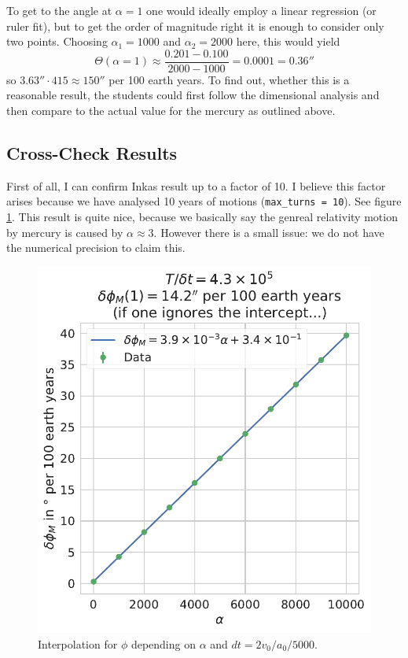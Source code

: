 \documentclass[12pt]{iopart}
\begin{document}
To get to the angle at $\alpha=1$ one would ideally employ a linear regression (or ruler fit), but to get the order of magnitude right it is enough to consider only two points.
Choosing $\alpha_1=1000$ and $\alpha_2=2000$ here, this would yield
\begin{equation}
	\Theta(\alpha=1) \approx \frac{0.201-0.100}{2000-1000} = 0.0001 = 0.36''
\end{equation}
so $3.63''\cdot 415\approx 150''$ per 100 earth years.
To find out, whether this is a reasonable result, the students could first follow the dimensional analysis and then compare to the actual value for the mercury  as outlined above.

\clearpage\subsection{Cross-Check Results}
First of all, I can confirm Inkas result up to a factor of 10.
I believe this factor arises because we have analysed 10 years of motions (\verb|max_turns = 10|).
See figure \ref{fcc1}.
This result is quite nice, because we basically say the genreal relativity motion by mercury is caused by $\alpha \approx 3$.
However there is a small issue: we do not have the numerical precision to claim this.
\begin{figure}[htb]
	\centering
	\includegraphics[width=.4\textwidth]{figs/alpha_interpolation.pdf}
	\caption{\label{fcc1}Interpolation for $\phi$ depending on $\alpha$ and $dt = 2 v_0 / a_0 / 5000$. }
\end{figure}
\end{document}
